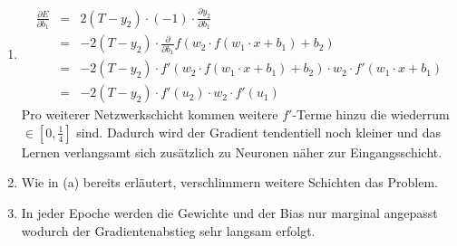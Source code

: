 \documentclass[DIN, pagenumber=false, fontsize=11pt, parskip=half]{scrartcl}
\begin{document}
    \subsection{}
    \begin{enumerate}[label=(\alph*)]
        \item 
            \begin{eqnarray*}
                \frac{\partial E}{\partial b_1} &=& 2 (T-y_2) \cdot (-1) \cdot \frac{\partial y_2}{\partial b_1} \\
                &=& -2 (T-y_2) \cdot \frac{\partial}{\partial b_1} f(w_2 \cdot f(w_1 \cdot x + b_1) + b_2) \\
                &=& -2 (T-y_2) \cdot f'(w_2 \cdot f(w_1 \cdot x + b_1) + b_2) \cdot w_2 \cdot f'(w_1 \cdot x + b_1) \\
                &=& -2 (T-y_2) \cdot f'(u_2) \cdot w_2 \cdot f'(u_1)
            \end{eqnarray*}
            Pro weiterer Netzwerkschicht kommen weitere $f'$-Terme hinzu die wiederrum $\in \left[0, \frac{1}{4}\right]$ sind. Dadurch wird der Gradient tendentiell noch kleiner und das Lernen verlangsamt sich zusätzlich zu Neuronen näher zur Eingangsschicht.
        \item Wie in (a) bereits erläutert, verschlimmern weitere Schichten das Problem.
        \item In jeder Epoche werden die Gewichte und der Bias nur marginal angepasst wodurch der Gradientenabstieg sehr langsam erfolgt.
    \end{enumerate}
\end{document}

